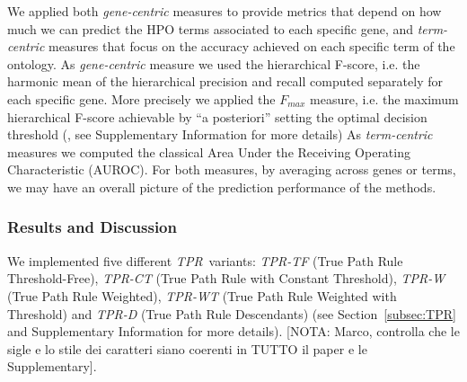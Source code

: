 \documentclass{bioinfo}
\newcommand{\htd}{{\em HTD}}
\newcommand{\tpr}{{\em TPR}}
\begin{document}
We applied both {\it gene-centric} measures to provide metrics that depend on how much we can predict the HPO terms associated to each specific gene, and {\it term-centric} measures that focus on the accuracy achieved on each specific term of the ontology.
As {\it gene-centric} measure we used the hierarchical F-score, i.e. the harmonic mean of the hierarchical precision and recall computed separately for each specific gene. More precisely 
we applied the $F_{max}$ measure, i.e. the maximum hierarchical F-score achievable by ``a posteriori'' setting the optimal decision threshold (\citet{Jiang16}, see Supplementary Information for more details) 
As {\it term-centric} measures we computed the classical Area Under the Receiving Operating Characteristic (AUROC). For both measures, by averaging across genes or terms, we may have an overall picture of the prediction performance of the methods.


\subsubsection{Results and Discussion}
\label{res}


We implemented five different \tpr~variants: {\em TPR-TF} (True Path Rule Threshold-Free), {\em TPR-CT} (True Path Rule with Constant Threshold), {\em TPR-W} (True Path Rule Weighted), {\em TPR-WT} (True Path Rule Weighted with Threshold) and  \textsl{TPR-D} (True Path Rule Descendants) (see Section~\ref{subsec:TPR} and Supplementary Information for more details).
[NOTA: Marco, controlla che le sigle e lo stile dei caratteri siano coerenti in TUTTO il paper e le Supplementary].
\end{document}

